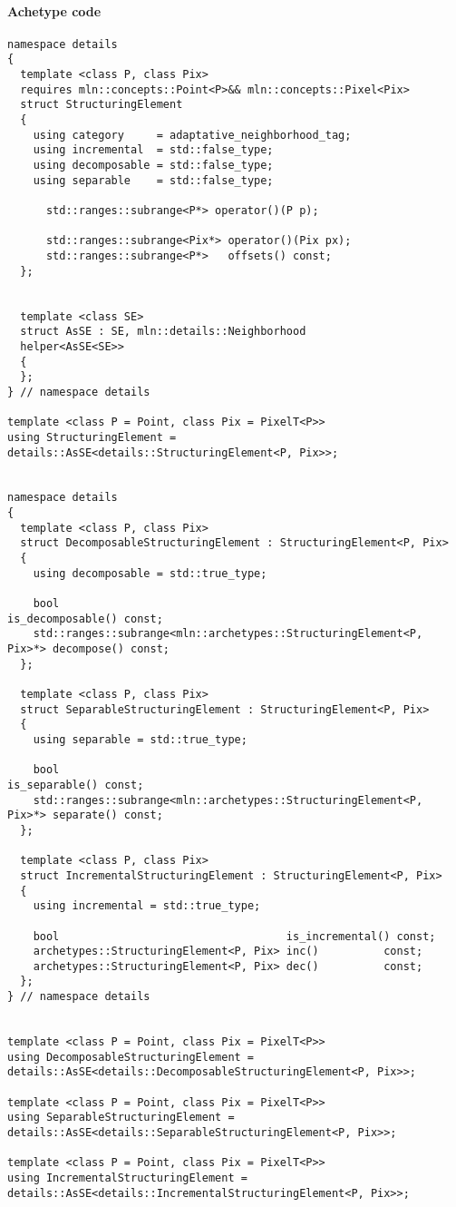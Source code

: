 \paragraph{Achetype code}

\begin{verbatim}
namespace details
{
  template <class P, class Pix>
  requires mln::concepts::Point<P>&& mln::concepts::Pixel<Pix>
  struct StructuringElement
  {
    using category     = adaptative_neighborhood_tag;
    using incremental  = std::false_type;
    using decomposable = std::false_type;
    using separable    = std::false_type;

      std::ranges::subrange<P*> operator()(P p);

      std::ranges::subrange<Pix*> operator()(Pix px);
      std::ranges::subrange<P*>   offsets() const;
  };


  template <class SE>
  struct AsSE : SE, mln::details::Neighborhood
  helper<AsSE<SE>>
  {
  };
} // namespace details

template <class P = Point, class Pix = PixelT<P>>
using StructuringElement = details::AsSE<details::StructuringElement<P, Pix>>;


namespace details
{
  template <class P, class Pix>
  struct DecomposableStructuringElement : StructuringElement<P, Pix>
  {
    using decomposable = std::true_type;

    bool                                                                is_decomposable() const;
    std::ranges::subrange<mln::archetypes::StructuringElement<P, Pix>*> decompose() const;
  };

  template <class P, class Pix>
  struct SeparableStructuringElement : StructuringElement<P, Pix>
  {
    using separable = std::true_type;

    bool                                                                is_separable() const;
    std::ranges::subrange<mln::archetypes::StructuringElement<P, Pix>*> separate() const;
  };

  template <class P, class Pix>
  struct IncrementalStructuringElement : StructuringElement<P, Pix>
  {
    using incremental = std::true_type;

    bool                                   is_incremental() const;
    archetypes::StructuringElement<P, Pix> inc()          const;
    archetypes::StructuringElement<P, Pix> dec()          const;
  };
} // namespace details


template <class P = Point, class Pix = PixelT<P>>
using DecomposableStructuringElement = details::AsSE<details::DecomposableStructuringElement<P, Pix>>;

template <class P = Point, class Pix = PixelT<P>>
using SeparableStructuringElement = details::AsSE<details::SeparableStructuringElement<P, Pix>>;

template <class P = Point, class Pix = PixelT<P>>
using IncrementalStructuringElement = details::AsSE<details::IncrementalStructuringElement<P, Pix>>;
\end{verbatim}


